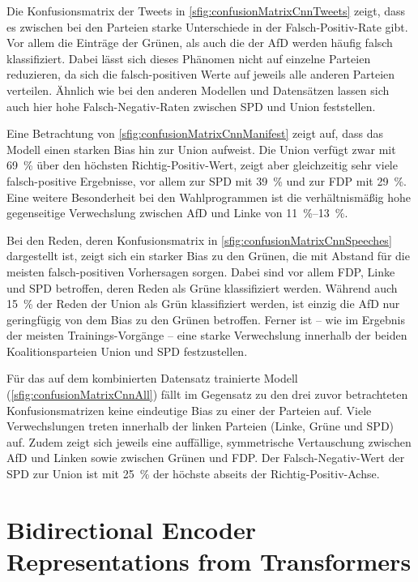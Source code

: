 Die Konfusionsmatrix der Tweets in \autoref{sfig:confusionMatrixCnnTweets} zeigt, dass es zwischen bei den Parteien starke Unterschiede in der Falsch-Positiv-Rate gibt. Vor allem die Einträge der Grünen, als auch die der \ac{AfD} werden häufig falsch klassifiziert. Dabei lässt sich dieses Phänomen nicht auf einzelne Parteien reduzieren, da sich die falsch-positiven Werte auf jeweils alle anderen Parteien verteilen. Ähnlich wie bei den anderen Modellen und Datensätzen lassen sich auch hier hohe Falsch-Negativ-Raten zwischen \ac{SPD} und Union feststellen.

Eine Betrachtung von \autoref{sfig:confusionMatrixCnnManifest} zeigt auf, dass das Modell einen starken Bias hin zur Union aufweist. Die Union verfügt zwar mit \SI{69}{\percent} über den höchsten Richtig-Positiv-Wert, zeigt aber gleichzeitig sehr viele falsch-positive Ergebnisse, vor allem zur \ac{SPD} mit \SI{39}{\percent} und zur \ac{FDP} mit \SI{29}{\percent}. Eine weitere Besonderheit bei den Wahlprogrammen ist die verhältnismäßig hohe gegenseitige Verwechslung zwischen \ac{AfD} und Linke von \SIrange{11}{13}{\percent}.

Bei den Reden, deren Konfusionsmatrix in \autoref{sfig:confusionMatrixCnnSpeeches} dargestellt ist, zeigt sich ein starker Bias zu den Grünen, die mit Abstand für die meisten falsch-positiven Vorhersagen sorgen. Dabei sind vor allem \ac{FDP}, Linke und \ac{SPD} betroffen, deren Reden als Grüne klassifiziert werden. Während auch \SI{15}{\percent} der Reden der Union als Grün klassifiziert werden, ist einzig die \ac{AfD} nur geringfügig von dem Bias zu den Grünen betroffen. Ferner ist -- wie im Ergebnis der meisten Trainings-Vorgänge -- eine starke Verwechslung innerhalb der beiden Koalitionsparteien Union und \ac{SPD} festzustellen.

Für das auf dem kombinierten Datensatz trainierte Modell (\autoref{sfig:confusionMatrixCnnAll}) fällt im Gegensatz zu den drei zuvor betrachteten Konfusionsmatrizen keine eindeutige Bias zu einer der Parteien auf. Viele Verwechslungen treten innerhalb der linken Parteien (Linke, Grüne und \ac{SPD}) auf. Zudem zeigt sich jeweils eine auffällige, symmetrische Vertauschung zwischen \ac{AfD} und Linken sowie zwischen Grünen und \ac{FDP}. Der Falsch-Negativ-Wert der \ac{SPD} zur Union ist mit \SI{25}{\percent} der höchste abseits der Richtig-Positiv-Achse.

\section{Bidirectional Encoder Representations from Transformers} \label{sec:trainingBert}

